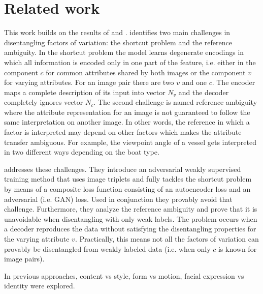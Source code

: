 \documentclass[10pt,letterpaper]{article}
\begin{document}
\section{Related work}
This work builds on the results of \cite{1711.07410} and \cite{1711.02245}.
\cite{1711.02245} identifies two main challenges in disentangling factors of variation: the shortcut problem and the reference ambiguity. In the shortcut problem the model learns degenerate encodings in which all information is encoded only in one part of the feature, i.e. either in the component $c$ for common attributes shared by both images or the component $v$ for varying attributes. For an image pair there are two $v$ and one $c$. The encoder maps a complete description of its input into vector $N_v$ and the decoder completely ignores vector $N_c$.
\newline The second challenge is named reference ambiguity where the attribute representation for an image is not guaranteed to follow the same interpretation on another image. In other words, the reference in which a factor is interpreted may depend on other factors which makes the attribute transfer ambiguous. For example, the viewpoint angle of a vessel gets interpreted in two different ways depending on the boat type.
\par[Understanding Degeneracies and Ambiguities in Attribute Transfer] addresses these challenges. They introduce an adversarial weakly supervised training method that uses image triplets and fully tackles the shortcut problem by means of a composite loss function consisting of an autoencoder loss and an adversarial (i.e. GAN) loss. Used in conjunction they provably avoid that challenge. 
Furthermore, they analyze the reference ambiguity and prove that it is unavoidable when disentangling with only weak labels. The problem occurs when a decoder reproduces the data without satisfying the disentangling properties for the varying attribute $v$. Practically, this means not all the factors of variation can provably be disentangled from weakly labeled data (i.e. when only $c$ is known for image pairs).    

In previous approaches, content vs style, form vs motion, facial expression vs identity were explored.
\end{document}

